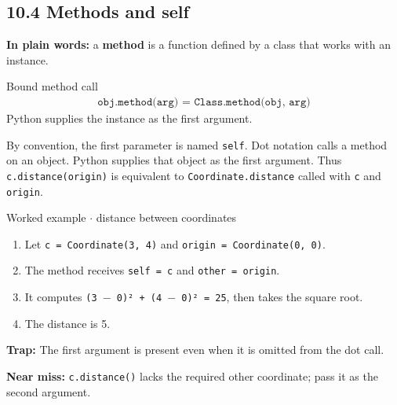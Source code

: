 \documentclass[11pt]{article}
\begin{document}
\begin{keepsection}
\section{10.4 Methods and self}

\begin{plainbox}\textbf{In plain words:} a \textbf{method} is a function defined by a class that works with an instance.\end{plainbox}

\begin{equationcard}{Bound method call}
\[ \begin{gathered} \texttt{obj.method(arg) = Class.method(obj, arg)} \end{gathered} \]
{\small Python supplies the instance as the first argument.}
\end{equationcard}

By convention, the first parameter is named \texttt{self}. Dot notation calls a method on an object. Python supplies that object as the first argument. Thus \texttt{c.distance(origin)} is equivalent to \texttt{Coordinate.distance} called with \texttt{c} and \texttt{origin}.

\begin{workedbox}{Worked example \ensuremath{\cdot} distance between coordinates}
\begin{enumerate}
\item Let \texttt{c = Coordinate(3, 4)} and \texttt{origin = Coordinate(0, 0)}.
\item The method receives \texttt{self = c} and \texttt{other = origin}.
\item It computes \texttt{(3 \ensuremath{-} 0)² + (4 \ensuremath{-} 0)² = 25}, then takes the square root.
\item The distance is 5.
\end{enumerate}
\end{workedbox}

\begin{notebox}\textbf{Trap:} The first argument is present even when it is omitted from the dot call.\end{notebox}

\begin{notebox}\textbf{Near miss:} \texttt{c.distance()} lacks the required other coordinate; pass it as the second argument.\end{notebox}


\end{keepsection}
\end{document}
